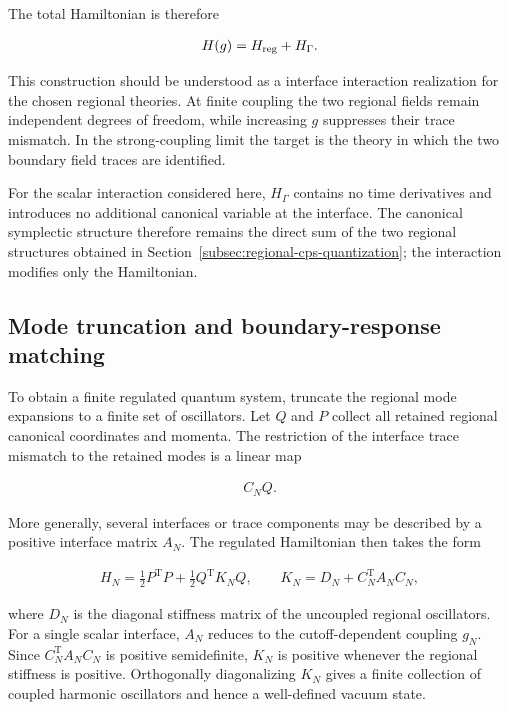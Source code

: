 The total Hamiltonian is therefore

\begin{align}
H(g)=H_{\rm reg}+H_\Gamma .
\end{align}

This construction should be understood as a interface interaction realization for the chosen regional theories. At finite coupling the two regional fields remain independent degrees of freedom, while increasing $g$ suppresses their trace mismatch. In the strong-coupling limit the target is the theory in which the two boundary field traces are identified.

For the scalar interaction considered here, $H_\Gamma$ contains no time derivatives and introduces no additional canonical variable at the interface. The canonical symplectic structure therefore remains the direct sum of the two regional structures obtained in Section~\ref{subsec:regional-cps-quantization}; the interaction modifies only the Hamiltonian.

\subsection{Mode truncation and boundary-response matching}\label{subsec:response-matching-general}

To obtain a finite regulated quantum system, truncate the regional mode expansions to a finite set of oscillators. Let $Q$ and $P$ collect all retained regional canonical coordinates and momenta. The restriction of the interface trace mismatch to the retained modes is a linear map

\begin{align}
C_N Q .
\end{align}

More generally, several interfaces or trace components may be described by a positive interface matrix $A_N$. The regulated Hamiltonian then takes the form

\begin{align}
H_N
=\frac12P^{\mathrm T}P+\frac12Q^{\mathrm T}K_NQ,
\qquad
K_N=D_N+C_N^{\mathrm T}A_NC_N,
\end{align}

where $D_N$ is the diagonal stiffness matrix of the uncoupled regional oscillators. For a single scalar interface, $A_N$ reduces to the cutoff-dependent coupling $g_N$. Since $C_N^{\mathrm T}A_NC_N$ is positive semidefinite, $K_N$ is positive whenever the regional stiffness is positive. Orthogonally diagonalizing $K_N$ gives a finite collection of coupled harmonic oscillators and hence a well-defined vacuum state.

